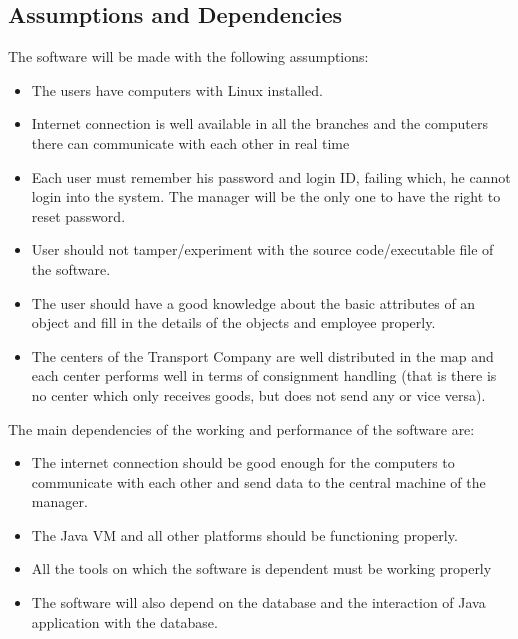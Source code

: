 \documentclass[english,openany,12pt,a4paper,dvipsnames]{book}
\begin{document}
        \subsection{Assumptions and Dependencies}
        The software will be made with the following assumptions:
                \begin{itemize}
                  \item The users have computers with Linux installed.
                  \item Internet connection is well available in all the branches and the computers there can
                communicate with each other in real time
                  \item Each user must remember his password and login ID, failing which, he cannot login into the
                system. The manager will be the only one to have the right to reset password.
                  \item User should not tamper/experiment with the source code/executable file of the software.
                  \item The user should have a good knowledge about the basic attributes of an object and fill in the
                details of the objects and employee properly.
                  \item The centers of the Transport Company are well distributed in the map and each center
                performs well in terms of consignment handling (that is there is no center which only
                receives goods, but does not send any or vice versa).
                \end{itemize}
        The main dependencies of the working and performance of the software are:
                \begin{itemize}
                  \item  The internet connection should be good enough for the computers to communicate with each
                other and send data to the central machine of the manager.
                  \item The Java VM and all other platforms should be functioning properly.
                  \item All the tools on which the software is dependent must be working properly
                  \item The software will also depend on the database and the interaction of Java application with
                the database.
                 \end{itemize}
\end{document}

